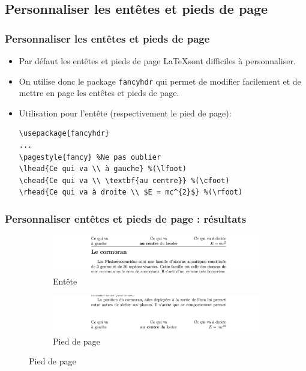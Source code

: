 \documentclass{clic_latex_beamer}
\begin{document}
\subsection{Personnaliser les entêtes et pieds de page}
\begin{frame}[fragile]
\frametitle{Personnaliser les entêtes et pieds de page}
    \begin{itemize}
    \item Par défaut les entêtes et pieds de page \LaTeX sont difficiles à personnaliser.
    \item On utilise donc le package \texttt{fancyhdr} qui permet de modifier facilement et de mettre en page les entêtes et pieds de page.
\item Utilisation pour l'entête (respectivement le pied de page):
\begin{lstlisting}
\usepackage{fancyhdr}
...   
\pagestyle{fancy} %Ne pas oublier
\lhead{Ce qui va \\ à gauche} %(\lfoot)
\chead{Ce qui va \\ \textbf{au centre}} %(\cfoot)
\rhead{Ce qui va à droite \\ $E = mc^{2}$} %(\rfoot)
\end{lstlisting}
\end{itemize}
\end{frame}

 
\begin{frame}
\frametitle{Personnaliser entêtes et pieds de page : résultats}
\begin{figure}
        \centering
        \begin{subfigure}[b]{\textwidth}
                \includegraphics[width=\textwidth]{illustrations/mepa/header.png}
                \caption*{Entête}
        \end{subfigure}
        
        \begin{subfigure}[b]{\textwidth}
              \includegraphics[width=\textwidth]{illustrations/mepa/footer.png}
                \caption*{Pied de page}
        \end{subfigure}
    \end{figure}


\end{frame}
\end{document}
